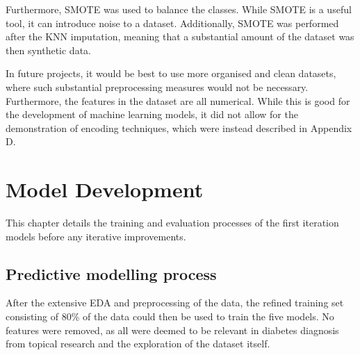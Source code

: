 \documentclass[12pt]{report}
\newcommand{\para}{\vspace{8pt}\noindent}
\begin{document}
\para Furthermore, SMOTE was used to balance the classes. While SMOTE is a useful tool, it can introduce noise to a dataset.
Additionally, SMOTE was performed after the KNN imputation, meaning that a substantial amount of the dataset was then synthetic data.

\para In future projects, it would be best to use more organised and clean datasets, where such substantial 
preprocessing measures would not be necessary. Furthermore, the features in the dataset are all numerical.
While this is good for the development of machine learning models, it did not allow for the demonstration 
of encoding techniques, which were instead described in Appendix D.

\chapter{Model Development} %
This chapter details the training and evaluation processes of the first iteration models
before any iterative improvements.


\section{Predictive modelling process}
After the extensive EDA and preprocessing of the data, the refined training set consisting of 80\% of the data 
could then be used to train the five models. No features were removed, as all were deemed to be relevant in
diabetes diagnosis from topical research and the exploration of the dataset itself. 

\end{document}
